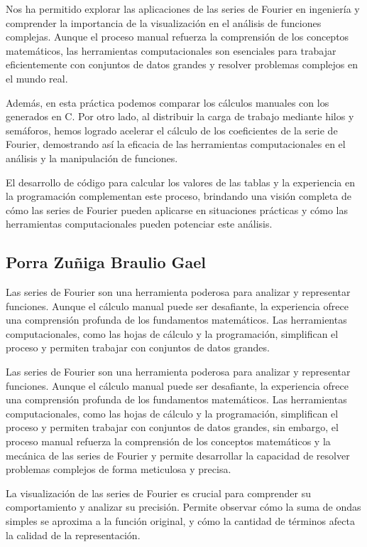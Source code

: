 Nos ha permitido explorar las aplicaciones de las series de Fourier en ingeniería y comprender la importancia de la visualización en el análisis de funciones complejas. Aunque el proceso manual refuerza la comprensión de los conceptos matemáticos, las herramientas computacionales son esenciales para trabajar eficientemente con conjuntos de datos grandes y resolver problemas complejos en el mundo real.

Además, en esta práctica podemos comparar los cálculos manuales con los generados en C. Por otro lado, al distribuir la carga de trabajo mediante hilos y semáforos, hemos logrado acelerar el cálculo de los coeficientes de la serie de Fourier, demostrando así la eficacia de las herramientas computacionales en el análisis y la manipulación de funciones.

El desarrollo de código para calcular los valores de las tablas y la experiencia en la programación complementan este proceso, brindando una visión completa de cómo las series de Fourier pueden aplicarse en situaciones prácticas y cómo las herramientas computacionales pueden potenciar este análisis.


\subsection{Porra Zuñiga Braulio Gael}

Las series de Fourier son una herramienta poderosa para analizar y representar funciones. Aunque el cálculo manual puede ser desafiante, la experiencia ofrece una comprensión profunda de los fundamentos matemáticos. Las herramientas computacionales, como las hojas de cálculo y la programación, simplifican el proceso y permiten trabajar con conjuntos de datos grandes.

Las series de Fourier son una herramienta poderosa para analizar y representar funciones. Aunque el cálculo manual puede ser desafiante, la experiencia ofrece una comprensión profunda de los fundamentos matemáticos. Las herramientas computacionales, como las hojas de cálculo y la programación, simplifican el proceso y permiten trabajar con conjuntos de datos grandes, sin embargo, el proceso manual refuerza la comprensión de los conceptos matemáticos y la mecánica de las series de Fourier y permite desarrollar la capacidad de resolver problemas complejos de forma meticulosa y precisa.

La visualización de las series de Fourier es crucial para comprender su comportamiento y analizar su precisión. Permite observar cómo la suma de ondas simples se aproxima a la función original, y cómo la cantidad de términos afecta la calidad de la representación.

